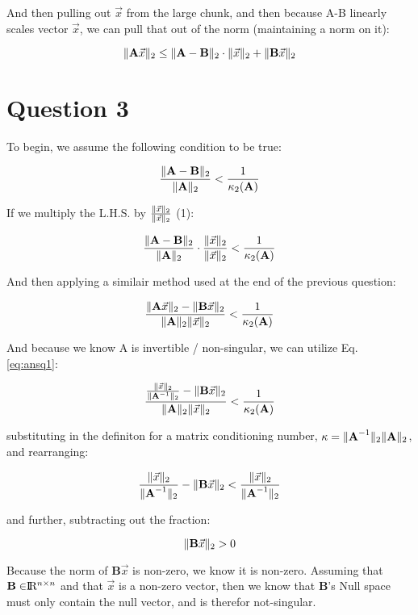 \documentclass{article}
\begin{document}
And then pulling out $\Vec{x}$ from the large chunk, and then because A-B linearly scales vector $\Vec{x}$, we can pull that out of the norm (maintaining a norm on it):

\begin{equation}
    \| \textbf{A}\Vec{x} \|_2 \leq \| \textbf{A}-\textbf{B} \|_2\cdot\| \Vec{x} \|_2 + \| \textbf{B}\Vec{x} \|_2
    \label{eq:ansq2}
\end{equation}


\newpage
\section*{Question 3}

To begin, we assume the following condition to be true:

\begin{equation}
    \frac{\| \textbf{A}-\textbf{B} \|_2}{\| \textbf{A} \|_2} < \frac{1}{\kappa_2 (\textbf{A})}
\end{equation}

If we multiply the L.H.S. by $\frac{\| \Vec{x} \|_2}{\| \Vec{x} \|_2}$ (1):

\begin{equation}
    \frac{\| \textbf{A}-\textbf{B} \|_2}{\| \textbf{A} \|_2} \cdot \frac{\| \Vec{x} \|_2}{\| \Vec{x} \|_2} < \frac{1}{\kappa_2 (\textbf{A})}
\end{equation}

And then applying a similair method used at the end of the previous question:

\begin{equation}
    \frac{\| \textbf{A}\Vec{x} \|_2 - \| \textbf{B}\Vec{x} \|_2}{\| \textbf{A} \|_2\| \Vec{x} \|_2} < \frac{1}{\kappa_2 (\textbf{A})}
\end{equation}

And because we know A is invertible / non-singular, we can utilize Eq. \ref{eq:ansq1}:

\begin{equation}
    \frac{\frac{\| \Vec{x} \|_2}{\| \textbf{A}^{-1} \|_2} - \| \textbf{B}\Vec{x} \|_2}{\| \textbf{A} \|_2\| \Vec{x} \|_2} < \frac{1}{\kappa_2 (\textbf{A})}
\end{equation}

substituting in the definiton for a matrix conditioning number, $\kappa = \| \textbf{A}^{-1} \|_2\| \textbf{A} \|_2$, and rearranging:

\begin{equation}
    \frac{\| \Vec{x} \|_2}{\| \textbf{A}^{-1} \|_2} - \| \textbf{B}\Vec{x} \|_2 < \frac{\| \Vec{x} \|_2}{\| \textbf{A}^{-1} \|_2}
\end{equation}

and further, subtracting out the fraction:

\begin{equation}
    \| \textbf{B}\Vec{x} \|_2 > 0
\end{equation}

Because the norm of $\textbf{B}\Vec{x}$ is non-zero, we know it is non-zero. Assuming that $\textbf{B}\in \R^{n \times n}$ and that $\Vec{x}$ is a non-zero vector, then we know that $\textbf{B}$'s Null space must only contain the null vector, and is therefor not-singular. 
\end{document}
